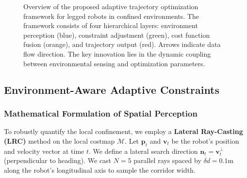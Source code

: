 \documentclass[lettersize,journal]{IEEEtran}
\begin{document}
\begin{figure}[!t]
\centering
\caption{Overview of the proposed adaptive trajectory optimization framework for legged robots in confined environments. The framework consists of four hierarchical layers: environment perception (blue), constraint adjustment (green), cost function fusion (orange), and trajectory output (red). Arrows indicate data flow direction. The key innovation lies in the dynamic coupling between environmental sensing and optimization parameters.}
\label{fig:framework}
\end{figure}

\subsection{Environment-Aware Adaptive Constraints}

\subsubsection{Mathematical Formulation of Spatial Perception}
To robustly quantify the local confinement, we employ a \textbf{Lateral Ray-Casting (LRC)} method on the local costmap $\mathcal{M}$. Let $\mathbf{p}_t$ and $\mathbf{v}_t$ be the robot's position and velocity vector at time $t$. We define a lateral search direction $\mathbf{n}_t = \mathbf{v}_t^\perp$ (perpendicular to heading). We cast $N=5$ parallel rays spaced by $\delta d = 0.1\text{m}$ along the robot's longitudinal axis to sample the corridor width.
\end{document}
